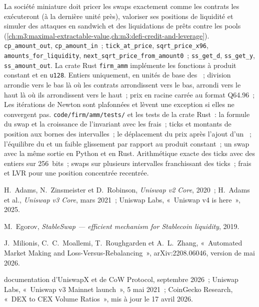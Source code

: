 \begin{build}
 La société miniature doit pricer les swaps exactement comme les contrats les exécuteront (à la dernière unité près), valoriser ses positions de liquidité et
simuler des attaques en sandwich et des liquidations de prêts contre les pools (\cref{ch:m3:maximal-extractable-value,ch:m3:defi-credit-and-leverage}).
 \texttt{cp\_amount\_out}, \texttt{cp\_amount\_in}~; \texttt{tick\_at\_price}, \texttt{sqrt\_price\_x96},
\texttt{amounts\_for\_liquidity}, \texttt{next\_sqrt\_price\_from\_amount0}~; \texttt{ss\_get\_d}, \texttt{ss\_get\_y}, \texttt{ss\_amount\_out}. La crate Rust
\texttt{firm\_amm} implémente les fonctions à produit constant et  en \texttt{u128}.
 Entiers uniquement, en unités de base des ~; division arrondie vers le bas là où les contrats arrondissent vers le bas, arrondi vers le haut là où ils arrondissent vers le haut~; prix en racine carrée au format Q64.96~;
Les itérations de Newton sont plafonnées et lèvent une exception si elles ne convergent pas.
 \texttt{code/firm/amm/tests/} et les tests de la crate Rust~: la formule du swap et la croissance de l'invariant avec les frais~; ticks et montants
de position aux bornes des intervalles~; le déplacement du prix après l'ajout d'un ~; l'équilibre du  et un faible glissement par rapport au produit constant~; un swap avec la même
sortie en Python et en Rust.
 Arithmétique exacte des ticks avec des entiers sur 256~bits~; swaps sur plusieurs intervalles franchissant des ticks~; frais et LVR pour une position concentrée recentrée.
\end{build}

\begin{omsources}
\item H.~Adams, N.~Zinsmeister et D.~Robinson, \emph{Uniswap v2 Core}, 2020~; H.~Adams et al., \emph{Uniswap v3 Core}, mars 2021~; Uniswap Labs, «~Uniswap v4 is
here~», 2025.
\item M.~Egorov, \emph{StableSwap --- efficient mechanism for Stablecoin liquidity}, 2019.
\item J.~Milionis, C.~C.~Moallemi, T.~Roughgarden et A.~L.~Zhang, «~Automated Market Making and Loss-Versus-Rebalancing~», arXiv:2208.06046, version de mai
2026.
\item documentation d'UniswapX et de CoW Protocol, septembre 2026~; Uniswap Labs, «~Uniswap v3 Mainnet launch~», 5 mai 2021~; CoinGecko Research, «~DEX to
CEX Volume Ratios~», mis à jour le 17 avril 2026.
\end{omsources}

